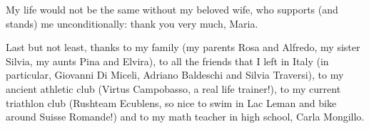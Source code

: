 My life would not be the same without my beloved wife, who supports (and stands) me unconditionally: thank you very much, Maria. 

Last but not least, thanks to my family (my parents Rosa and Alfredo, my sister Silvia, my aunts Pina and Elvira), to all the friends that I left in Italy (in particular, Giovanni Di Miceli, Adriano Baldeschi and Silvia Traversi), to my ancient athletic club (Virtus Campobasso, a real life trainer!), to my current triathlon club (Rushteam Ecublens, so nice to swim in Lac Leman and bike around Suisse Romande!) and to my math teacher in high school, Carla Mongillo.
